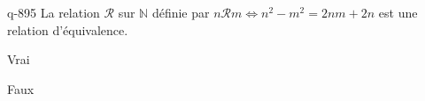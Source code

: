 \begin{truefalse}{q-895}
La relation $\mathcal R$ sur $\mathbb N$ définie par $n\mathcal R m \iff n^2-m^2 = 2nm+2n$ est une relation d'équivalence.
\item Vrai
\item* Faux
\end{truefalse}

